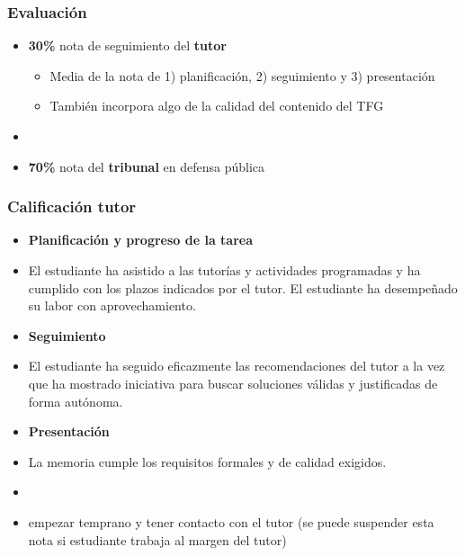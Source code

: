 \documentclass[aspectratio=43]{beamer}
\begin{document}
\begin{frame}
\frametitle{Evaluación}
\centering

\begin{itemize}
  \item \textbf{30\%} nota de seguimiento del \textbf{tutor}
  \begin{itemize}
    \item Media de la nota de 1) planificación, 2) seguimiento y 3) presentación
    \item También incorpora algo de la calidad del contenido del TFG
  \end{itemize}
  \item[]
  \item \textbf{70\%} nota del \textbf{tribunal} en defensa pública
\end{itemize}

\end{frame}

\begin{frame}
\frametitle{Calificación tutor}
\centering

\begin{itemize}
  \item \textbf{Planificación y progreso de la tarea}
  \item[] {\small El estudiante ha asistido a las tutorías y actividades programadas y ha cumplido con los plazos indicados por el tutor. El estudiante ha desempeñado su labor con aprovechamiento.}
  \item \textbf{Seguimiento}
  \item[] {\small El estudiante ha seguido eficazmente las recomendaciones del tutor a la vez que ha mostrado iniciativa para buscar soluciones válidas y justificadas de forma autónoma.}
  \item \textbf{Presentación}
  \item[] {\small La memoria cumple los requisitos formales y de calidad exigidos.}
  \item[]
  \item {} empezar temprano y tener contacto con el tutor (se puede suspender esta nota si estudiante trabaja al margen del tutor)
\end{itemize}

\end{frame}
\end{document}
